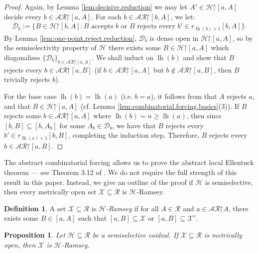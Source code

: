 \documentclass[10pt,a4paper]{amsart}
\theoremstyle{plain}
\numberwithin{equation}{section}
\newtheorem{proposition}[theorem]{Proposition}
\theoremstyle{definition}
\newtheorem{definition}[theorem]{Definition}
\newcommand{\func}{\operatorname}
\newcommand{\cal}{\mathcal}
\newcommand{\restrictedto}{\mathord{\upharpoonright}}
\newcommand{\X}{\cal{X}}
\renewcommand{\H}{\cal{H}}
\newcommand{\lh}{\func{lh}}
\newcommand{\D}{\cal{D}}
\begin{document}
\begin{proof}
    Again, by Lemma \ref{lem:decisive.reduction} we may let $A' \in \H\restrictedto[a,A]$ decide every $b \in \cal{AR}\restrictedto[a,A]$. For each $b \in \cal{AR}\restrictedto[b,A]$, we let:
    \begin{align*}
        \D_b := \{B \in \H\restrictedto[b,A] : \text{$B$ accepts $b$ or $B$ rejects every $b' \in r_{\lh(b)+1}[b,A]$}\}.
    \end{align*}
    By Lemma \ref{lem:one-point.reject.reduction}, $\D_b$ is dense open in $\H\restrictedto[a,A]$, so by the semiselectivity property of $\H$ there exists some $B \in \H\restrictedto[a,A]$ which diagonalises $\{\D_b\}_{b\in\cal{AR}\restrictedto[a,A]}$. We shall induct on $\lh(b)$ and show that $B$ rejects every $b \in \cal{AR}\restrictedto[a,B]$ (if $b \in \cal{AR}\restrictedto[a,A]$ but $b \notin \cal{AR}\restrictedto[a,B]$, then $B$ trivially rejects $b$).

    For the base case $\lh(b) = \lh(a)$ (i.e. $b = a$), it follows from that $A$ rejects $a$, and that $B \in \H\restrictedto[a,A]$ (cf. Lemma \ref{lem:combinatorial.forcing.basics}(3)). If $B$ rejects some $b \in \cal{AR}\restrictedto[a,A]$ where $\lh(b) = n \geq \lh(a)$, then since $[b,B] \subseteq [b,A_b]$ for some $A_b \in \D_b$, we have that $B$ rejects every $b' \in r_{\lh(a)+1}[b,B]$, completing the induction step. Therefore, $B$ rejects every $b \in \cal{AR}\restrictedto[a,B]$.
\end{proof}

The abstract combinatorial forcing allows us to prove the abstract local Ellentuck theorem --- see Theorem 3.12 of \cite{DMN15}. We do not require the full strength of this result in this paper. Instead, we give an outline of the proof if $\H$ is semiselective, then every metrically open set $\X \subseteq \cal{R}$ is $\H$-Ramsey.

\begin{definition}
    A set $\X \subseteq \cal{R}$ is \emph{$\H$-Ramsey} if for all $A \in \cal{R}$ and $a \in \cal{AR}\restrictedto A$, there exists some $B \in [a,A]$ such that $[a,B] \subseteq \X$ or $[a,B] \subseteq \X^c$.
\end{definition}

\begin{proposition}
\label{prop:open.is.H-ramsey}
    Let $\H \subseteq \cal{R}$ be a semiselective coideal. If $\X \subseteq \cal{R}$ is metrically open, then $\X$ is $\H$-Ramsey.
\end{proposition}
\end{document}
